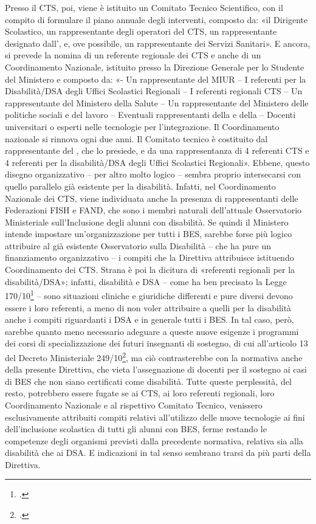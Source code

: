 \begin{description}
Presso il CTS, poi, viene è istituito un Comitato Tecnico Scientifico, con il compito di formulare il piano annuale degli interventi, composto da: «il Dirigente Scolastico, un rappresentante degli operatori del CTS, un rappresentante designato dall', e, ove possibile, un rappresentante dei Servizi Sanitari».
E ancora, si prevede la nomina di un referente regionale dei CTS e anche di un Coordinamento Nazionale, istituito presso la Direzione Generale per lo Studente del Ministero e composto da: «- Un rappresentante del MIUR – I referenti per la Disabilità/DSA degli Uffici Scolastici Regionali – I referenti regionali CTS – Un rappresentante del Ministero della Salute – Un rappresentante del Ministero delle politiche sociali e del lavoro – Eventuali rappresentanti della   e della   – Docenti universitari o esperti nelle tecnologie per l'integrazione. Il Coordinamento nazionale si rinnova ogni due anni. Il Comitato tecnico è costituito dal rappresentante del , che lo presiede, e da una rappresentanza di 4 referenti CTS e 4 referenti per la disabilità/DSA degli Uffici Scolastici Regionali».
Ebbene, questo disegno organizzativo – per altro molto logico – sembra proprio intersecarsi con quello parallelo già esistente per la disabilità. Infatti, nel Coordinamento Nazionale dei CTS, viene individuata anche la presenza di rappresentanti delle Federazioni FISH e FAND, che sono i membri naturali dell'attuale Osservatorio Ministeriale sull'Inclusione degli alunni con disabilità.
Se quindi il Ministero intende impostare un'organizzazione per tutti i BES, sarebbe forse più logico attribuire al già esistente Osservatorio sulla Disabilità – che ha pure un finanziamento organizzativo – i compiti che la Direttiva attribuisce istituendo Coordinamento dei CTS.
Strana è poi la dicitura di «referenti regionali per la disabilità/DSA»; infatti, disabilità e DSA – come ha ben precisato la Legge 170/10\footcite{legge170} – sono situazioni cliniche e giuridiche differenti e pure diversi devono essere i loro referenti, a meno di non voler attribuire a quelli per la disabilità anche i compiti riguardanti i DSA e in generale tutti i BES. In tal caso, però, sarebbe quanto meno necessario adeguare a queste nuove esigenze i programmi dei corsi di specializzazione dei futuri insegnanti di sostegno, di cui all'articolo 13 del Decreto Ministeriale 249/10\footcite{DM_249_2010}, ma ciò contrasterebbe con la normativa anche della presente Direttiva, che vieta l'assegnazione di docenti per il sostegno ai casi di BES che non siano certificati come disabilità.
Tutte queste perplessità, del resto, potrebbero essere fugate se ai CTS, ai loro referenti regionali, loro Coordinamento Nazionale e al rispettivo Comitato Tecnico, venissero esclusivamente attribuiti compiti relativi all'utilizzo delle nuove tecnologie ai fini dell'inclusione scolastica di tutti gli alunni con BES, ferme restando le competenze degli organismi previsti dalla precedente normativa, relativa sia alla disabilità che ai DSA. E indicazioni in tal senso sembrano trarsi da più parti della Direttiva.
\end{description}
